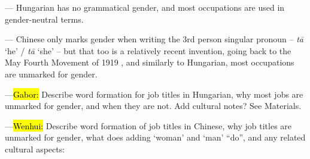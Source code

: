 \documentclass[11pt]{article}
\newcommand{\zh}[1]{\simplifiedchinesefont{#1}\rmfamily}
\begin{document}



\noindent--- Hungarian has no grammatical gender, and most occupations are used in gender-neutral terms.

--- Chinese only marks gender when writing the 3rd person singular pronoun -- \zh{他} \textit{tā} `he' / \zh{她} \textit{tā} `she' -- but that too is a relatively recent invention, going back to the May Fourth Movement of 1919 \citep{bi_2013_tazi}, and similarly to Hungarian, most occupations are unmarked for gender.

---\hl{Gabor:} Describe word formation for job titles in Hungarian, why most jobs are unmarked for gender, and when they are not. Add cultural notes? See Materials.

---\hl{Wenhui:} Describe word formation of job titles in Chinese, why job titles are unmarked for gender, what does adding \zh{女} `woman' and \zh{男} `man' ``do'', and any related cultural aspects:
\end{document}
